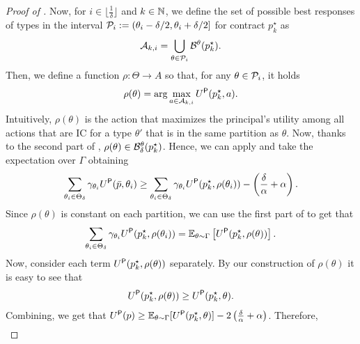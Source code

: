 \begin{proof}[Proof of ]
        Now, for $i\in \lfloor \frac{1}{\delta}\rfloor$ and $k\in\mathbb{N}$, we define the set of possible best responses of types in the interval $\mathcal{P}_i:=(\theta_i-\delta/2,\theta_i+\delta/2]$ for contract $p^\star_k$ as 
        \[
        \mathcal{A}_{k,i}=\bigcup_{\theta\in\mathcal{P}_i} \mathcal{B}^{\theta}(p^\star_k).
        \]
        Then, we define a function $\rho:\Theta\to A$ so that, for any $\theta\in\mathcal{P}_i$, it holds
        \[
	\rho(\theta) = \arg\max_{a\in\mathcal{A}_{k,i}} U^\textsf{P}( p^\star_k,a).
	\]
   Intuitively, $\rho(\theta)$ is the action that maximizes the principal's utility among all actions that are IC for a type $\theta'$ that is in the same partition as $\theta$.
    Now, thanks to the second part of , $\rho(\theta)\in\mathcal{B}_\delta^{\theta}(p^\star_k)$.
    Hence, we can apply  and take the expectation over $\Gamma$ obtaining
	\begin{align}\label{eq:ptastmp2}
    \sum_{\theta_i\in\Theta_{\delta}}\gamma_{ \theta_i}U^\textsf{P}(\bar p, \theta_i)\ge \sum_{\theta_i\in\Theta_{\delta}}\gamma_{\theta_i}U^\textsf{P}(p_k^\star, \rho(\theta_i))-\left(\frac\delta\alpha+\alpha\right).
	\end{align}
	Since $\rho(\theta)$ is constant on each partition, we can use the first part of  to get that
	\[
	\sum_{\theta_i\in\Theta_{\delta} }\gamma_{\theta_i}U^\textsf{P}(p_k^\star, \rho(\theta_i))=\mathbb{E}_{\theta\sim\Gamma} \left[U^\textsf{P}(p_k^\star, \rho(\theta))\right].
	\]
%	
	Now, consider each term $U^\textsf{P}(p_k^\star, \rho(\theta))$ separately. By our construction of $\rho(\theta)$ it is easy to see that 
    \begin{align}\label{eq:PTASFinal}
    U^\textsf{P}(p^\star_k, \rho(\theta))\ge U^\textsf{P}(p_k^\star, \theta).
    \end{align}
    Combining,  we get that \(U^\textsf{P}(p)\ge\mathbb{E}_{\theta\sim\Gamma}[U^\textsf{P}(p^\star_k,\theta)]-2\left(\frac\delta\alpha+\alpha\right)\). Therefore,
	\begin{align*}

\end{align*}
\end{proof}
